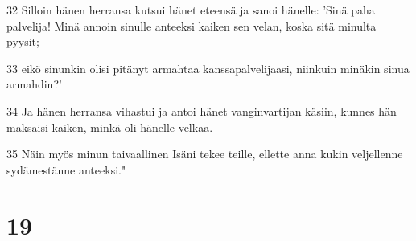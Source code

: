 \par 32 Silloin hänen herransa kutsui hänet eteensä ja sanoi hänelle: 'Sinä paha palvelija! Minä annoin sinulle anteeksi kaiken sen velan, koska sitä minulta pyysit;
\par 33 eikö sinunkin olisi pitänyt armahtaa kanssapalvelijaasi, niinkuin minäkin sinua armahdin?'
\par 34 Ja hänen herransa vihastui ja antoi hänet vanginvartijan käsiin, kunnes hän maksaisi kaiken, minkä oli hänelle velkaa.
\par 35 Näin myös minun taivaallinen Isäni tekee teille, ellette anna kukin veljellenne sydämestänne anteeksi."

\chapter{19}

